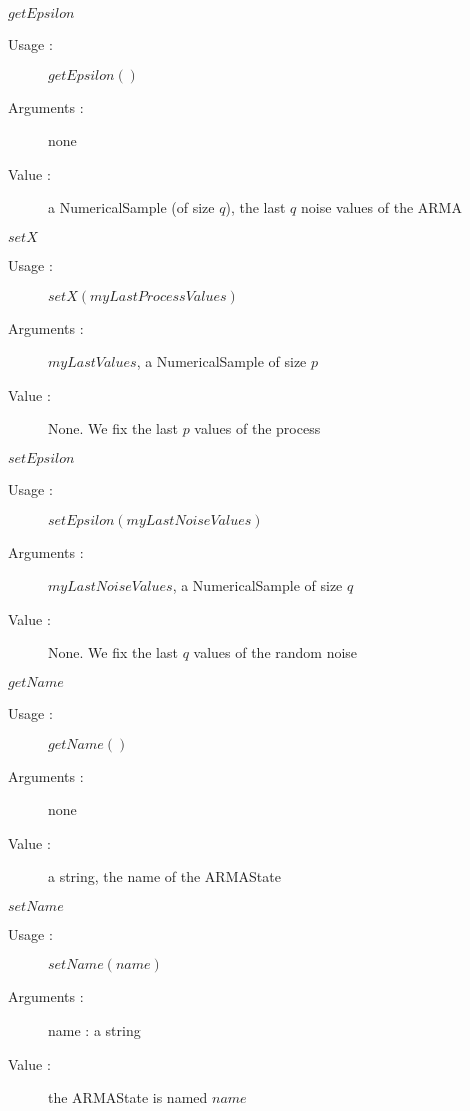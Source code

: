 \begin{description}
\begin{description}
  \item $getEpsilon$
    \begin{description}
    \item[Usage :] $getEpsilon()$
    \item[Arguments :] none
    \item[Value :] a NumericalSample (of size $q$), the last $q$ noise values of the ARMA
    \end{description}
    \bigskip

   \item $setX$
    \begin{description}
    \item[Usage :] $setX(myLastProcessValues)$
    \item[Arguments :] $myLastValues$, a NumericalSample of size $p$
    \item[Value :] None. We fix the last $p$ values of the process
    \end{description}
    \bigskip

   \item $setEpsilon$
    \begin{description}
    \item[Usage :] $setEpsilon(myLastNoiseValues)$
    \item[Arguments :] $myLastNoiseValues$, a NumericalSample of size $q$
    \item[Value :] None. We fix the last $q$ values of the random noise
    \end{description}
    \bigskip

  \item $getName$
    \begin{description}
    \item[Usage :] $getName()$
    \item[Arguments :] none
    \item[Value :] a string, the name of the ARMAState
    \end{description}
    \bigskip

  \item $setName$
    \begin{description}
    \item[Usage :] $setName(name)$
    \item[Arguments :] name : a string
    \item[Value :] the ARMAState is named $name$
    \end{description}

  \end{description}

\end{description}

